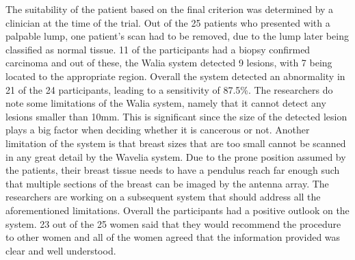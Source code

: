 The suitability of the patient based on the final criterion was determined by a clinician at the time of the trial. Out
of the 25 patients who presented with a palpable lump, one patient's scan had to be removed, due to the lump later being
classified as normal tissue. 11 of the participants had a biopsy confirmed carcinoma and out of these, the Walia system detected 9 lesions, with 7
being located to the appropriate region. Overall the system detected an abnormality in 21 of the 24 participants,
leading to a sensitivity of 87.5\%. The researchers do note some limitations of the Walia system, namely that it cannot
detect any lesions smaller than 10mm. This is significant since the size of the detected lesion plays a big factor when
deciding whether it is cancerous or not. Another limitation of the system is that breast sizes that are too small cannot
be scanned in any great detail by the Wavelia system. Due to the prone position assumed by the patients, their breast
tissue needs to have a pendulus reach far enough such that multiple sections of the breast can be imaged by the antenna
array. The researchers are working on a subsequent system that should address all the aforementioned limitations.
Overall the participants had a positive outlook on the system. 23 out of the 25 women said that they would recommend the
procedure to other women and all of the women agreed that the information provided was clear and well understood.
